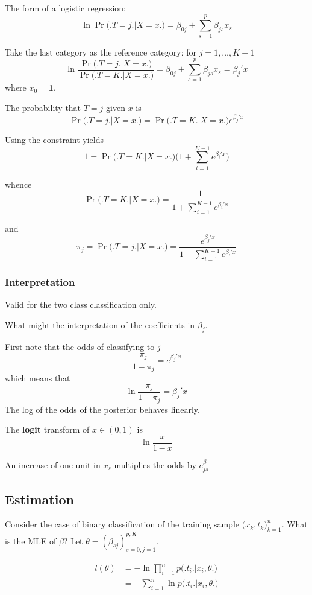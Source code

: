 \documentclass[a4paper]{article}
\newcommand{\brac}[1]{{\left ( #1 \right )}}
\begin{document}
The form of a logistic regression:
\[\ln\Pr\big(\big. T=j\big.\big\rvert X=x\big.\big) = \beta_{0j} + \sum_{s=1}^p\beta_{js} x_s \]

Take the last category as the reference category: for $j=1,\ldots,K-1$
\[\ln\frac{\Pr\big(\big. T=j\big.\big\rvert X=x\big.\big)}{\Pr\big(\big. T=K\big.\big\rvert X=x\big.\big)}
	= \beta_{0j} + \sum_{s=1}^p\beta_{js} x_s = \beta_j'x \]
where $x_0 = \mathbf{1}$.

The probability that $T=j$ given $x$ is
\[\Pr\big(\big. T=j\big.\big\rvert X=x\big.\big) = \Pr\big(\big. T=K\big.\big\rvert X=x\big.\big) e^{\beta_j'x}\]

Using the constraint yields
\[1 = \Pr\big(\big. T=K\big.\big\rvert X=x\big.\big) \Big(1 + \sum_{i=1}^{K-1} e^{\beta_i'x}\Big)\]

whence 
\[\Pr\big(\big. T=K\big.\big\rvert X=x\big.\big) = \frac{1}{1 + \sum_{i=1}^{K-1} e^{\beta_i'x}}\]

and
\[\pi_j = \Pr\big(\big. T=j\big.\big\rvert X=x\big.\big) = \frac{e^{\beta_j'x}}{1 + \sum_{i=1}^{K-1} e^{\beta_i'x}}\]

\subsubsection{Interpretation} %
\label{ssub:interpretation}

Valid for the two class classification only.

What might the interpretation of the coefficients in $\beta_j$.

First note that the odds of classifying to $j$
\[\frac{\pi_j}{1-\pi_j} = e^{\beta_j'x}\]
which means that
\[\ln \frac{\pi_j}{1-\pi_j} = \beta_j'x\]
The log of the odds of the posterior behaves linearly.

The \textbf{logit} transform of $x\in \brac{0,1}$ is 
\[\ln\frac{x}{1-x}\]

An increase of one unit in $x_s$ multiplies the odds by $e^\beta_{js}$


\subsection{Estimation} %
\label{sub:estimation}
Consider the case of binary classification of the training sample $\big(x_k,t_k\big)_{k=1}^n$. What is the MLE of $\beta$?
Let $\theta = \brac{\beta_{sj}}_{s=0, j=1}^{p, K}$.

\begin{align*}
	l(\theta) &= - \ln \prod_{i=1}^n p\big(\big. t_i\big.\big\rvert x_i, \theta\big.\big) \\
	&= - \sum_{i=1}^n \ln p\big(\big. t_i\big.\big\rvert x_i, \theta\big.\big)
\end{align*}
\end{document}
